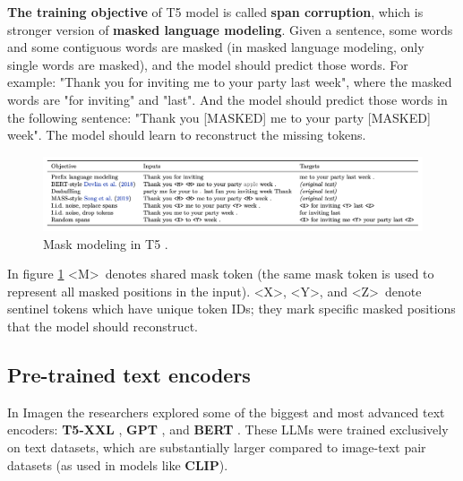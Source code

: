 \textbf{The training objective} of T5 model is called \textbf{span corruption}, which is stronger version of \textbf{masked language modeling}. Given a sentence, some words and some contiguous words are masked (in masked language modeling, only single words are masked), and the model should predict those words. For example: "Thank you for inviting me to your party last week", where the masked words are "for inviting" and "last". And the model should predict those words in the following sentence: "Thank you [MASKED] me to your party [MASKED] week". The model should learn to reconstruct the missing tokens.

\begin{figure}[h]
    \centering
    \includegraphics[width=1\textwidth]{images/imagen/t5_objectives.png}
    \caption{Mask modeling in T5 \cite{t5_model}.}
    \label{fig:t5_objectives}
\end{figure}

In figure \ref{fig:t5_objectives} \textless M\textgreater\ denotes shared mask token (the same mask token is used to represent all masked positions in the input). \textless X\textgreater, \textless Y\textgreater, and \textless Z\textgreater\ denote sentinel tokens which have unique token IDs; they mark specific masked positions that the model should reconstruct.















\subsection{Pre-trained text encoders}

In Imagen \cite{imagen} the researchers explored some of the biggest and most advanced text encoders: \textbf{T5-XXL} \cite{t5_model}, \textbf{GPT} \cite{gpt} \cite{mingpt} \cite{gpt_another}, and \textbf{BERT} \cite{bert}. These LLMs were trained exclusively on text datasets, which are substantially larger compared to image-text pair datasets (as used in models like \textbf{CLIP}).

